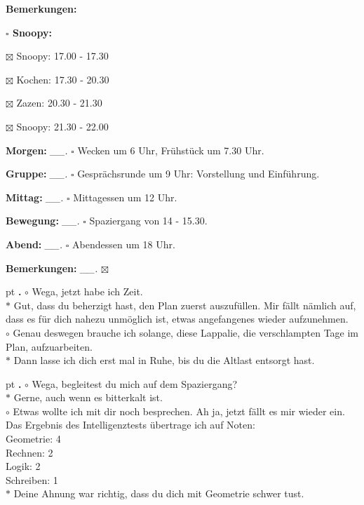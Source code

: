 \documentclass[10pt,a4paper]{article}
\newcounter{notec}
\newcommand\notep[1]{%
  \stepcounter{notec}
  \vskip #1pt
  {\bf\arabic{notec}.}
}
\newcommand\prop[1] {{\color {alizarin} {\bf #1}}}             %
\newcommand\opti[1] {{\color {amethyst} {\bf #1}}}             %
\newcommand\mand[1] {{\color {burntorange} {\bf #1}}}          %
\newcommand\bottomspace{\vskip 4pt}
\newcommand\n[1] { {\sl #1.} \hskip 5pt }
\begin{document}
\begin{mdframed}[style=daystyle]
\begin{labeling}{{\mand {Bemerkungen:}}}
\begin{minipage}{0.75\textwidth}
\begin{labeling}{\prop {$\square$ {Snoopy:}}}
      \item[$\boxtimes$ Snoopy:] 17.00 - 17.30
      \item[$\boxtimes$ Kochen:] 17.30 - 20.30
        
      \item[$\boxtimes$ Zazen:]  20.30 - 21.30
      \item[$\boxtimes$ Snoopy:] 21.30 - 22.00
      \end{labeling}
    \end{minipage}
    \bottomspace
  \item[{\opti {Morgen:}}]       \n{\_\_} $\square$ Wecken um 6 Uhr, Frühstück um 7.30 Uhr.
  \item[{\opti {Gruppe:}}]       \n{\_\_} $\square$ Gesprächsrunde um 9 Uhr: Vorstellung und Einführung.
  \item[{\opti {Mittag:}}]       \n{\_\_} $\square$ Mittagessen um 12 Uhr.
  \item[{\opti {Bewegung:}}]     \n{\_\_} $\square$ Spaziergang von 14 - 15.30.
  \item[{\opti {Abend:}}]        \n{\_\_} $\square$ Abendessen um 18 Uhr.
  \item[{\mand {Bemerkungen:}}]  \n{\_\_} $\boxtimes$
  \end{labeling}
    
  \setcounter{notec}{0}
  
  \notep 0 $\circ$ Wega, jetzt habe ich Zeit. \\
  $\ast$ Gut, dass du beherzigt hast, den Plan zuerst auszufüllen. Mir fällt
  nämlich auf, dass es für dich nahezu unmöglich ist, etwas angefangenes wieder
  aufzunehmen. \\
  $\circ$ Genau deswegen brauche ich solange, diese Lappalie, die verschlampten
  Tage im Plan, aufzuarbeiten. \\
  $\ast$ Dann lasse ich dich erst mal in Ruhe, bis du die Altlast entsorgt hast.

  \notep 4 $\circ$ Wega, begleitest du mich auf dem Spaziergang? \\
  $\ast$ Gerne, auch wenn es bitterkalt ist.  \\
  $\circ$ Etwas wollte ich mit dir noch besprechen. Ah ja, jetzt fällt es mir
  wieder ein. Das Ergebnis des Intelligenztests übertrage ich auf Noten: \\
  Geometrie: 4 \\
  Rechnen: 2 \\
  Logik: 2 \\
  Schreiben: 1 \\
  $\ast$ Deine Ahnung war richtig, dass du dich mit Geometrie schwer tust.


\end{mdframed}
\end{document}
